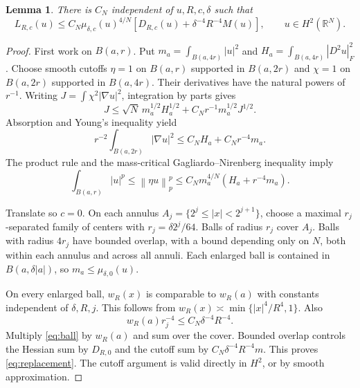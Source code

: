 \documentclass[11pt,a4paper]{article}
\newtheorem{lemma}[theorem]{Lemma}
\theoremstyle{remark}\newtheorem{remark}[theorem]{Remark}
\newcommand{\R}{\mathbb R}
\newcommand{\norm}[1]{\left\|#1\right\|}
\begin{document}
\begin{lemma}\label{lem:local}
There is $C_N$ independent of $u,R,c,\delta$ such that
\begin{equation}\label{eq:replacement}
 L_{R,c}(u)\le C_N\mu_{\delta,c}(u)^{4/N}
 \left[D_{R,c}(u)+\delta^{-4}R^{-4}M(u)\right],\qquad u\in H^2(\R^N).
\end{equation}
\end{lemma}
\begin{proof}
First work on $B(a,r)$. Put $m_a=\int_{B(a,4r)}|u|^2$ and
$H_a=\int_{B(a,4r)}|D^2u|_F^2$. Choose smooth cutoffs $\eta=1$ on $B(a,r)$ supported in $B(a,2r)$ and $\chi=1$ on $B(a,2r)$ supported in $B(a,4r)$. Their derivatives have the natural powers of $r^{-1}$.
Writing $J=\int\chi^2|\nabla u|^2$, integration by parts gives
\[
 J\le\sqrt N\,m_a^{1/2}H_a^{1/2}+C_Nr^{-1}m_a^{1/2}J^{1/2}.
\]
Absorption and Young's inequality yield
\[
 r^{-2}\int_{B(a,2r)}|\nabla u|^2\le C_NH_a+C_Nr^{-4}m_a.
\]
The product rule and the mass-critical Gagliardo--Nirenberg inequality imply
\begin{equation}\label{eq:ball}
 \int_{B(a,r)}|u|^p\le\norm{\eta u}_p^p
 \le C_Nm_a^{4/N}(H_a+r^{-4}m_a).
\end{equation}

Translate so $c=0$. On each annulus $A_j=\{2^j\le|x|<2^{j+1}\}$, choose a maximal $r_j$-separated family of centers with $r_j=\delta2^j/64$. Balls of radius $r_j$ cover $A_j$. Balls with radius $4r_j$ have bounded overlap, with a bound depending only on $N$, both within each annulus and across all annuli. Each enlarged ball is contained in $B(a,\delta|a|)$, so $m_a\le\mu_{\delta,0}(u)$.

On every enlarged ball, $w_R(x)$ is comparable to $w_R(a)$ with constants independent of $\delta,R,j$. This follows from
$w_R(x)\asymp\min\{|x|^4/R^4,1\}$. Also
\[
 w_R(a)r_j^{-4}\le C_N\delta^{-4}R^{-4}.
\]
Multiply \eqref{eq:ball} by $w_R(a)$ and sum over the cover. Bounded overlap controls the Hessian sum by $D_{R,0}$ and the cutoff sum by $C_N\delta^{-4}R^{-4}m$. This proves \eqref{eq:replacement}. The cutoff argument is valid directly in $H^2$, or by smooth approximation.
\end{proof}
\end{document}

